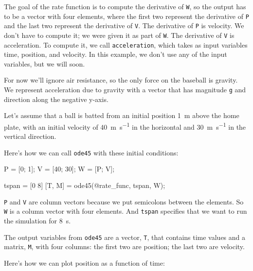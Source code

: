 
The goal of the rate function is to compute the derivative of \lstinline{W}, so the output has to be a vector with four elements, where the first two represent the derivative of \lstinline{P}  and the last two represent the derivative of \lstinline{V}.
The derivative of \lstinline{P} is velocity.  We don't have to compute it; we were given it as part of \lstinline{W}.
The derivative of \lstinline{V} is acceleration.  To compute it, we call \lstinline{acceleration}, which takes as input variables time, position, and velocity.  In this example, we don't use any of the input variables, but we will soon.


For now we'll ignore air resistance, so the only force on the baseball is gravity.  We represent acceleration due to gravity with a vector that has magnitude \lstinline{g} and direction along the negative y-axis.

Let's assume that a ball is batted from an initial position \SI{1}{\meter} above the home plate, with an initial velocity of \SI{40}{\meter\per\second} in the horizontal and \SI{30}{\meter\per\second} in the vertical direction.


Here's how we can call \lstinline{ode45} with these initial conditions:
 
\begin{code}
    P = [0; 1];       %
    V = [40; 30];     %
    W = [P; V];       %
    
    tspan = [0 8]
    [T, M] = ode45(@rate_func, tspan, W);
\end{code}

\lstinline{P} and \lstinline{V} are column vectors because we put semicolons between the elements.  
So \lstinline{W} is a column vector with four elements.
And \lstinline{tspan} specifies that we want to run the simulation for \SI{8}{\second}.


The output variables from \lstinline{ode45} are a vector, 
\lstinline{T}, that contains time values and a matrix, \lstinline{M}, with four columns: the first two are position; the last two are velocity.

Here's how we can plot position as a function of time:

